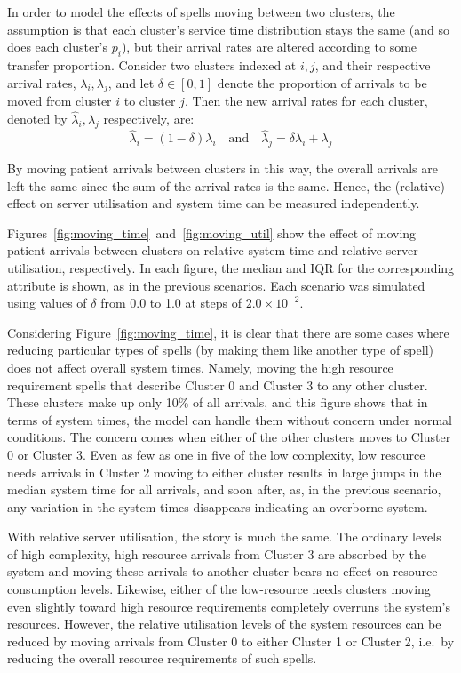 In order to model the effects of spells moving between two clusters, the
assumption is that each cluster's service time distribution stays the same (and
so does each cluster's \(p_i\)), but their arrival rates are altered according
to some transfer proportion. Consider two clusters indexed at \(i, j\), and
their respective arrival rates, \(\lambda_i, \lambda_j\), and let \(\delta \in
[0, 1]\) denote the proportion of arrivals to be moved from cluster \(i\) to
cluster \(j\). Then the new arrival rates for each cluster, denoted by
\(\hat\lambda_i, \hat\lambda_j\) respectively, are:
\begin{equation}\label{eq:moving}
    \hat\lambda_i = \left(1 - \delta\right) \lambda_i
    \quad \text{and} \quad
    \hat\lambda_j = \delta\lambda_i + \lambda_j
\end{equation}

By moving patient arrivals between clusters in this way, the overall arrivals
are left the same since the sum of the arrival rates is the same. Hence, the
(relative) effect on server utilisation and system time can be measured
independently.

Figures~\ref{fig:moving_time}~and~\ref{fig:moving_util} show the effect of
moving patient arrivals between clusters on relative system time and relative
server utilisation, respectively. In each figure, the median and IQR for the
corresponding attribute is shown, as in the previous scenarios. Each scenario
was simulated using values of \(\delta\) from 0.0 to 1.0 at steps of \(2.0
\times 10^{-2}\).

Considering Figure~\ref{fig:moving_time}, it is clear that there are some cases
where reducing particular types of spells (by making them like another type of
spell) does not affect overall system times. Namely, moving the high resource
requirement spells that describe Cluster 0 and Cluster 3 to any other cluster.
These clusters make up only 10\% of all arrivals, and this figure shows that in
terms of system times, the model can handle them without concern under normal
conditions. The concern comes when either of the other clusters moves to Cluster
0 or Cluster 3. Even as few as one in five of the low complexity, low resource
needs arrivals in Cluster 2 moving to either cluster results in large jumps in
the median system time for all arrivals, and soon after, as, in the previous
scenario, any variation in the system times disappears indicating an overborne
system.

With relative server utilisation, the story is much the same. The ordinary
levels of high complexity, high resource arrivals from Cluster 3 are absorbed by
the system and moving these arrivals to another cluster bears no effect on
resource consumption levels. Likewise, either of the low-resource needs clusters
moving even slightly toward high resource requirements completely overruns the
system’s resources. However, the relative utilisation levels of the system
resources can be reduced by moving arrivals from Cluster 0 to either Cluster 1
or Cluster 2, i.e.\ by reducing the overall resource requirements of such spells.

